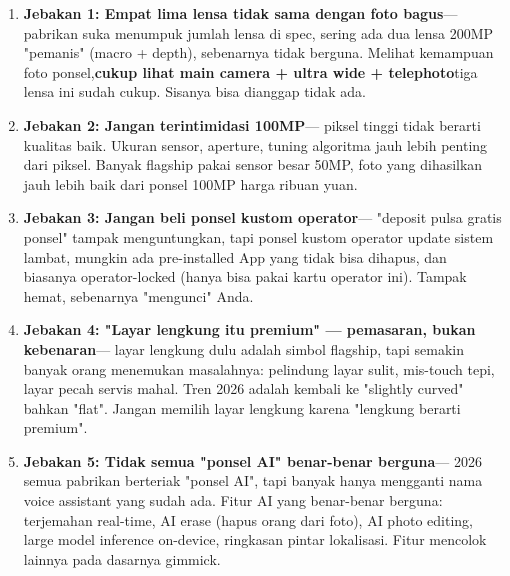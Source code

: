 
\begin{enumerate}
  \item \textbf{Jebakan 1: Empat lima lensa tidak sama dengan foto bagus}— pabrikan suka menumpuk jumlah lensa di spec, sering ada dua lensa 200MP "pemanis" (macro + depth), sebenarnya tidak berguna. Melihat kemampuan foto ponsel,\textbf{cukup lihat main camera + ultra wide + telephoto}tiga lensa ini sudah cukup. Sisanya bisa dianggap tidak ada.
  \item \textbf{Jebakan 2: Jangan terintimidasi 100MP}— piksel tinggi tidak berarti kualitas baik. Ukuran sensor, aperture, tuning algoritma jauh lebih penting dari piksel. Banyak flagship pakai sensor besar 50MP, foto yang dihasilkan jauh lebih baik dari ponsel 100MP harga ribuan yuan.
  \item \textbf{Jebakan 3: Jangan beli ponsel kustom operator}— "deposit pulsa gratis ponsel" tampak menguntungkan, tapi ponsel kustom operator update sistem lambat, mungkin ada pre-installed App yang tidak bisa dihapus, dan biasanya operator-locked (hanya bisa pakai kartu operator ini). Tampak hemat, sebenarnya "mengunci" Anda.
  \item \textbf{Jebakan 4: "Layar lengkung itu premium" — pemasaran, bukan kebenaran}— layar lengkung dulu adalah simbol flagship, tapi semakin banyak orang menemukan masalahnya: pelindung layar sulit, mis-touch tepi, layar pecah servis mahal. Tren 2026 adalah kembali ke "slightly curved" bahkan "flat". Jangan memilih layar lengkung karena "lengkung berarti premium".
  \item \textbf{Jebakan 5: Tidak semua "ponsel AI" benar-benar berguna}— 2026 semua pabrikan berteriak "ponsel AI", tapi banyak hanya mengganti nama voice assistant yang sudah ada. Fitur AI yang benar-benar berguna: terjemahan real-time, AI erase (hapus orang dari foto), AI photo editing, large model inference on-device, ringkasan pintar lokalisasi. Fitur mencolok lainnya pada dasarnya gimmick.
\end{enumerate}


